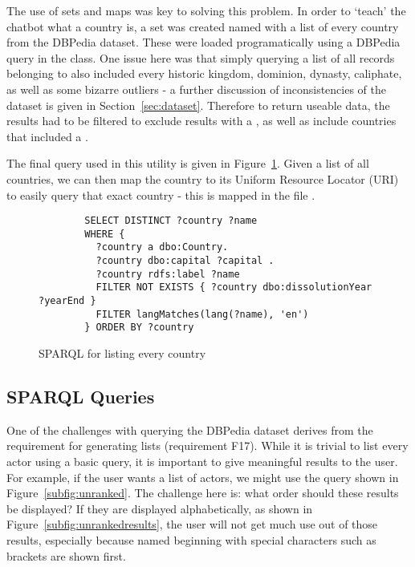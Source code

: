 The use of sets and maps was key to solving this problem. In order to `teach' the chatbot what a country is, a set was created named  with a list of every country from the DBPedia dataset. These were loaded programatically using a DBPedia query in the  class. One issue here was that simply querying a list of all records belonging to  also included every historic kingdom, dominion, dynasty, caliphate, as well as some bizarre outliers - a further discussion of inconsistencies of the dataset is given in Section~\ref{sec:dataset}. Therefore to return useable data, the results had to be filtered to exclude results with a , as well as include countries that included a .

The final query used in this utility is given in Figure~\ref{fig:sparqlcountry}. Given a list of all countries, we can then map the country to its Uniform Resource Locator (URI) to easily query that exact country - this is mapped in the file .

\begin{figure}[h]
	\begin{lstlisting}
		SELECT DISTINCT ?country ?name
		WHERE {
		  ?country a dbo:Country.
		  ?country dbo:capital ?capital .
		  ?country rdfs:label ?name 
		  FILTER NOT EXISTS { ?country dbo:dissolutionYear ?yearEnd }
		  FILTER langMatches(lang(?name), 'en')
		} ORDER BY ?country
	\end{lstlisting}
	\caption{SPARQL for listing every country}
	\label{fig:sparqlcountry}
\end{figure}


\subsection{SPARQL Queries}
One of the challenges with querying the DBPedia dataset derives from the requirement for generating lists (requirement F17). While it is trivial to list every actor using a basic query, it is important to give meaningful results to the user. For example, if the user wants a list of actors, we might use the query shown in Figure~\ref{subfig:unranked}. The challenge here is: what order should these results be displayed? If they are displayed alphabetically, as shown in Figure~\ref{subfig:unrankedresults}, the user will not get much use out of those results, especially because named beginning with special characters such as brackets are shown first.

